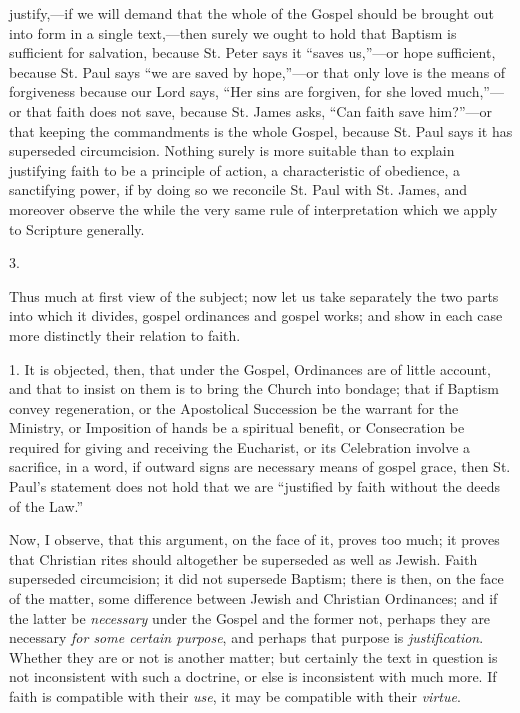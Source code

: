 justify,—if we will demand that the whole of the Gospel should be
brought out into form in a single text,—then surely we ought to hold
that Baptism is sufficient for salvation, because St. Peter says it
``saves us,''—or hope sufficient, because St. Paul says
``we are saved by hope,''—or that only love is the means of
forgiveness because our Lord says, ``Her sins are forgiven, for
she loved much,''—or that faith does not save, because St. James
asks, ``Can faith save him?''—or that keeping the
commandments is the whole Gospel, because St. Paul says it has
superseded circumcision. Nothing surely is more suitable than to
explain justifying faith to be a principle of action, a characteristic
of obedience, a sanctifying power, if by doing so we reconcile St.
Paul with St. James, and moreover observe the while the very same rule
of interpretation which we apply to Scripture generally.

3.

Thus much at first view of the subject; now let us take separately
the two parts into which it divides, gospel ordinances and gospel
works; and show in each case more distinctly their relation to faith.

1. It is objected, then, that under the Gospel, Ordinances are of
little account, and that to insist on them is to bring the Church into
bondage; that if Baptism convey regeneration, or the Apostolical
Succession be the warrant for the Ministry, or Imposition of hands be
a spiritual benefit, or Consecration be required for giving and
receiving the Eucharist, or its Celebration involve a sacrifice, in a
word, if outward signs are necessary means of gospel grace, then
St. Paul's statement does not hold that we are ``justified by
faith without the deeds of the Law.''

Now, I observe, that this argument, on the face of it, proves too
much; it proves that Christian rites should altogether be superseded
as well as Jewish. Faith superseded circumcision; it did not supersede
Baptism; there is then, on the face of the matter, some difference
between Jewish and Christian Ordinances; and if the latter be \emph{necessary}
under the Gospel and the former not, perhaps they are necessary \emph{for
some certain purpose}, and perhaps that purpose is \emph{justification}.
Whether they are or not is another matter; but certainly the text in
question is not inconsistent with such a doctrine, or else is
inconsistent with much more. If faith is compatible with their \emph{use},
it may be compatible with their \emph{virtue}.

